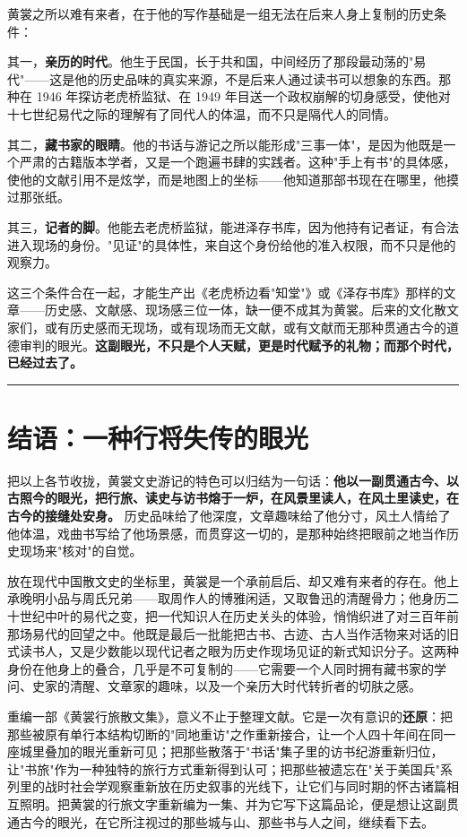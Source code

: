 \documentclass[UTF8,fontset=none,zihao=-4,a4paper]{ctexart}
\begin{document}
黄裳之所以难有来者，在于他的写作基础是一组无法在后来人身上复制的历史条件：


其一，\textbf{亲历的时代}。他生于民国，长于共和国，中间经历了那段最动荡的"易代"——这是他的历史品味的真实来源，不是后来人通过读书可以想象的东西。那种在 1946 年探访老虎桥监狱、在 1949 年目送一个政权崩解的切身感受，使他对十七世纪易代之际的理解有了同代人的体温，而不只是隔代人的同情。


其二，\textbf{藏书家的眼睛}。他的书话与游记之所以能形成"三事一体"，是因为他既是一个严肃的古籍版本学者，又是一个跑遍书肆的实践者。这种"手上有书"的具体感，使他的文献引用不是炫学，而是地图上的坐标——他知道那部书现在在哪里，他摸过那张纸。


其三，\textbf{记者的脚}。他能去老虎桥监狱，能进泽存书库，因为他持有记者证，有合法进入现场的身份。"见证"的具体性，来自这个身份给他的准入权限，而不只是他的观察力。


这三个条件合在一起，才能生产出《老虎桥边看"知堂"》或《泽存书库》那样的文章——历史感、文献感、现场感三位一体，缺一便不成其为黄裳。后来的文化散文家们，或有历史感而无现场，或有现场而无文献，或有文献而无那种贯通古今的道德审判的眼光。\textbf{这副眼光，不只是个人天赋，更是时代赋予的礼物；而那个时代，已经过去了。}


\medskip\hrule\medskip

\section{结语：一种行将失传的眼光}


把以上各节收拢，黄裳文史游记的特色可以归结为一句话：\textbf{他以一副贯通古今、以古照今的眼光，把行旅、读史与访书熔于一炉，在风景里读人，在风土里读史，在古今的接缝处安身。} 历史品味给了他深度，文章趣味给了他分寸，风土人情给了他体温，戏曲书写给了他场景感，而贯穿这一切的，是那种始终把眼前之地当作历史现场来"核对"的自觉。


放在现代中国散文史的坐标里，黄裳是一个承前启后、却又难有来者的存在。他上承晚明小品与周氏兄弟——取周作人的博雅闲适，又取鲁迅的清醒骨力；他身历二十世纪中叶的易代之变，把一代知识人在历史关头的体验，悄悄织进了对三百年前那场易代的回望之中。他既是最后一批能把古书、古迹、古人当作活物来对话的旧式读书人，又是少数能以现代记者之眼为历史作现场见证的新式知识分子。这两种身份在他身上的叠合，几乎是不可复制的——它需要一个人同时拥有藏书家的学问、史家的清醒、文章家的趣味，以及一个亲历大时代转折者的切肤之感。


重编一部《黄裳行旅散文集》，意义不止于整理文献。它是一次有意识的\textbf{还原}：把那些被原有单行本结构切断的"同地重访"之作重新接合，让一个人四十年间在同一座城里叠加的眼光重新可见；把那些散落于"书话"集子里的访书纪游重新归位，让"书旅"作为一种独特的旅行方式重新得到认可；把那些被遗忘在"关于美国兵"系列里的战时社会学观察重新放在历史叙事的光线下，让它们与同时期的怀古诸篇相互照明。把黄裳的行旅文字重新编为一集、并为它写下这篇品论，便是想让这副贯通古今的眼光，在它所注视过的那些城与山、那些书与人之间，继续看下去。
\end{document}
